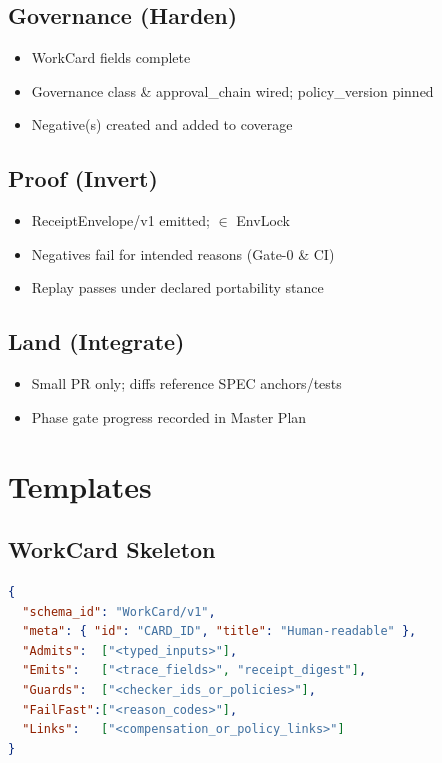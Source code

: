 \documentclass[11pt]{article}
\newcommand{\code}[1]{\path{#1}}
\begin{document}
\subsection{Governance (Harden)}
\begin{itemize}
  \item WorkCard fields complete
  \item Governance class \& approval\_chain wired; policy\_version pinned
  \item Negative(s) created and added to coverage
\end{itemize}
\subsection{Proof (Invert)}
\begin{itemize}
  \item ReceiptEnvelope/v1 emitted; \code{checker_hash} $\in$ EnvLock
  \item Negatives fail for intended reasons (Gate-0 \& CI)
  \item Replay passes under declared portability stance
\end{itemize}
\subsection{Land (Integrate)}
\begin{itemize}
  \item Small PR only; diffs reference SPEC anchors/tests
  \item Phase gate progress recorded in Master Plan
\end{itemize}

\section{Templates}
\subsection{WorkCard Skeleton}
\begin{lstlisting}[language=json,caption={WorkCard skeleton}]
{
  "schema_id": "WorkCard/v1",
  "meta": { "id": "CARD_ID", "title": "Human-readable" },
  "Admits":  ["<typed_inputs>"],
  "Emits":   ["<trace_fields>", "receipt_digest"],
  "Guards":  ["<checker_ids_or_policies>"],
  "FailFast":["<reason_codes>"],
  "Links":   ["<compensation_or_policy_links>"]
}
\end{lstlisting}
\end{document}
